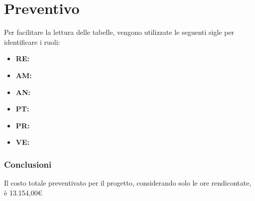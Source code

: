 \section{Preventivo}

Per facilitare la lettura delle tabelle, vengono utilizzate le seguenti sigle per identificare i ruoli:

\begin{itemize}
\item \textbf{RE:} \respProg
\item \textbf{AM:} \ammProg
\item \textbf{AN:} \analProg
\item \textbf{PT:} \progetProg
\item \textbf{PR:} \programProg
\item \textbf{VE:} \verifProg
\end{itemize}







\subsubsection{Conclusioni}

Il costo totale preventivato per il progetto, considerando solo le ore rendicontate, è 13.154,00\euro{}

